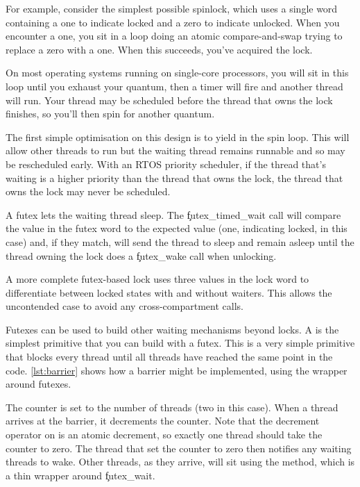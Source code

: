 For example, consider the simplest possible spinlock, which uses a single word containing a one to indicate locked and a zero to indicate unlocked.
When you encounter a one, you sit in a loop doing an atomic compare-and-swap trying to replace a zero with a one.
When this succeeds, you've acquired the lock.

On most operating systems running on single-core processors, you will sit in this loop until you exhaust your quantum, then a timer will fire and another thread will run.
Your thread may be scheduled before the thread that owns the lock finishes, so you'll then spin for another quantum.

The first simple optimisation on this design is to yield in the spin loop.
This will allow other threads to run but the waiting thread remains runnable and so may be rescheduled early.
With an RTOS priority scheduler, if the thread that's waiting is a higher priority than the thread that owns the lock, the thread that owns the lock may never be scheduled.

A futex lets the waiting thread sleep.
The \c{futex_timed_wait} call will compare the value in the futex word to the expected value (one, indicating locked, in this case) and, if they match, will send the thread to sleep and remain asleep until the thread owning the lock does a \c{futex_wake} call when unlocking.

A more complete futex-based lock uses three values in the lock word to differentiate between locked states with and without waiters.
This allows the uncontended case to avoid any cross-compartment calls.

Futexes can be used to build other waiting mechanisms beyond locks.
A  is the simplest primitive that you can build with a futex.
This is a very simple primitive that blocks every thread until all threads have reached the same point in the code.
\ref{lst:barrier} shows how a barrier might be implemented, using the  wrapper around futexes.

\codelisting[filename=examples/barrier/barrier.cc,marker=entry,label=lst:barrier,caption="Implementing a barrier with a futex"]{}

The counter is set to the number of threads (two in this case).
When a thread arrives at the barrier, it decrements the counter.
Note that the decrement operator on  is an atomic decrement, so exactly one thread should take the counter to zero.
The thread that set the counter to zero then notifies any waiting threads to wake.
Other threads, as they arrive, will sit using the  method, which is a thin wrapper around \c{futex_wait}.

